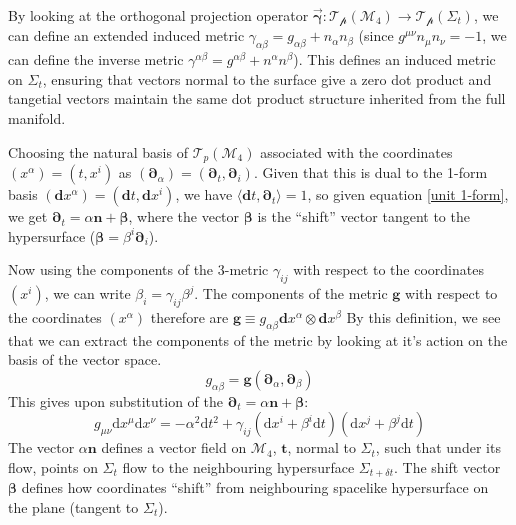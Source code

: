 \documentclass[aps,prd,reprint,preprintnumbers,showpacs,floatfix,nofootinbib,superscript address]{revtex4-2}
\begin{document}
By looking at the orthogonal projection operator $\Vec{\mathbf{\gamma}} : \mathcal{T_p}(\mathcal{M}_4) \rightarrow \mathcal{T_p}(\Sigma_t)$, we can define an extended induced metric $\gamma_{\alpha\beta} = g_{\alpha\beta} + n_\alpha n_\beta$ (since $g^{\mu\nu} n_\mu n_\nu = -1$, we can define the inverse metric $\gamma^{\alpha\beta} = g^{\alpha\beta} + n^\alpha n^\beta$). This defines an induced metric on $\Sigma_t$, ensuring that vectors normal to the surface give a zero dot product and tangetial vectors maintain the same dot product structure inherited from the full manifold. 

Choosing the natural basis of $\mathcal{T}_p(\mathcal{M}_4)$ associated with the coordinates $(x^\alpha) =(t,x^i)$ as $(\bm{\partial}_\alpha)=(\bm{\partial}_t, \bm{\partial}_i)$. Given that this is dual to the 1-form basis $(\textbf{d}x^\alpha) = (\textbf{d}t, \textbf{d}x^i)$, we have $\langle \textbf{d}t, \bm{\partial}_t \rangle = 1$, so given equation \ref{unit 1-form}, we get $\bm{\partial}_t = \alpha \bm{n} + \bm{\beta}$, where the vector $\bm{\beta}$ is the ``shift'' vector tangent to the hypersurface ($\bm{\beta} = \beta^i \boldsymbol{\partial}_i$). 

Now using the components of the 3-metric $\gamma_{i j}$ with respect to the coordinates $(x^i)$, we can write $\beta_i = \gamma_{ij}\beta^j$. The components of the metric $\bm{g}$ with respect to the coordinates $(x^\alpha)$ therefore are $\bm{g} \equiv g_{\alpha \beta} \textbf{d}x^\alpha \otimes \textbf{d}x^\beta$
By this definition, we see that we can extract the components of the metric by looking at it's action on the basis of the vector space. 
\begin{equation}
    g_{\alpha\beta} = \bm{g} (\bm{\partial}_\alpha, \bm{\partial}_\beta)
\end{equation}
This gives upon substitution of the $\bm{\partial}_t = \alpha \bm{n} + \bm{\beta}$:
\begin{equation} \label{General split Metric}
    g_{\mu \nu} \text{d}x^\mu\text{d}x^\nu = -\alpha^2 \text{d}t^2 + \gamma_{ij}(\text{d}x^i + \beta^i \text{d}t)(\text{d}x^j + \beta^j \text{d}t)
\end{equation}
The vector $\alpha \bm{n}$ defines a vector field on $\mathcal{M}_4$, $\bm{t}$, normal to $\Sigma_t$, such that under its flow, points on $\Sigma_t$ flow to the neighbouring hypersurface $\Sigma_{t+\delta t}$. The shift vector $\bm{\beta}$ defines how coordinates ``shift'' from neighbouring spacelike hypersurface on the plane (tangent to $\Sigma_t$). 
\end{document}
